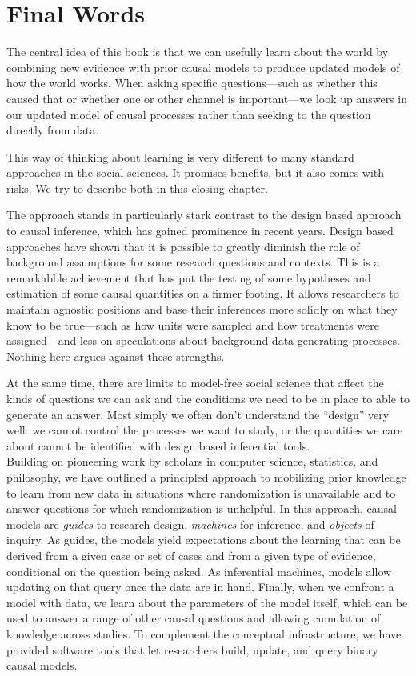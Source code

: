 \documentclass[
  12pt,
]{book}
\begin{document}
\hypertarget{conclusionchapter}{%
\chapter{Final Words}\label{conclusionchapter}}

The central idea of this book is that we can usefully learn about the world by combining new evidence with prior causal models to produce updated models of how the world works. When asking specific questions---such as whether this caused that or whether one or other channel is important---we look up answers in our updated model of causal processes rather than seeking to the question directly from data.

This way of thinking about learning is very different to many standard approaches in the social sciences. It promises benefits, but it also comes with risks. We try to describe both in this closing chapter.

The approach stands in particularly stark contrast to the design based approach to causal inference, which has gained prominence in recent years. Design based approaches have shown that it is possible to greatly diminish the role of background assumptions for some research questions and contexts. This is a remarkabble achievement that has put the testing of some hypotheses and estimation of some causal quantities on a firmer footing. It allows researchers to maintain agnostic positions and base their inferences more solidly on what they know to be true---such as how units were sampled and how treatments were assigned---and less on speculations about background data generating processes. Nothing here argues against these strengths.

At the same time, there are limits to model-free social science that affect the kinds of questions we can ask and the conditions we need to be in place to able to generate an answer. Most simply we often don't understand the ``design'' very well: we cannot control the processes we want to study, or the quantities we care about cannot be identified with design based inferential tools.\\

Building on pioneering work by scholars in computer science, statistics, and philosophy, we have outlined a principled approach to mobilizing prior knowledge to learn from new data in situations where randomization is unavailable and to answer questions for which randomization is unhelpful. In this approach, causal models are \emph{guides} to research design, \emph{machines} for inference, and \emph{objects} of inquiry. As guides, the models yield expectations about the learning that can be derived from a given case or set of cases and from a given type of evidence, conditional on the question being asked. As inferential machines, models allow updating on that query once the data are in hand. Finally, when we confront a model with data, we learn about the parameters of the model itself, which can be used to answer a range of other causal questions and allowing cumulation of knowledge across studies. To complement the conceptual infrastructure, we have provided software tools that let researchers build, update, and query binary causal models.
\end{document}
